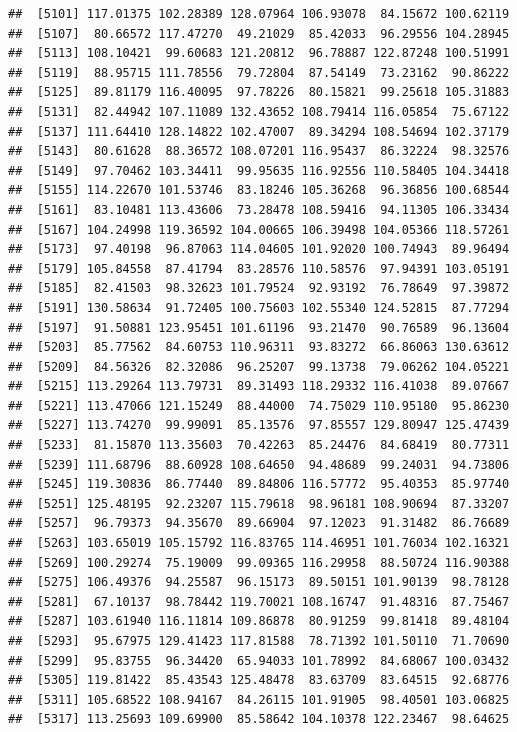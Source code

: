 \documentclass[
]{article}
\begin{document}
\begin{verbatim}
##  [5101] 117.01375 102.28389 128.07964 106.93078  84.15672 100.62119
##  [5107]  80.66572 117.47270  49.21029  85.42033  96.29556 104.28945
##  [5113] 108.10421  99.60683 121.20812  96.78887 122.87248 100.51991
##  [5119]  88.95715 111.78556  79.72804  87.54149  73.23162  90.86222
##  [5125]  89.81179 116.40095  97.78226  80.15821  99.25618 105.31883
##  [5131]  82.44942 107.11089 132.43652 108.79414 116.05854  75.67122
##  [5137] 111.64410 128.14822 102.47007  89.34294 108.54694 102.37179
##  [5143]  80.61628  88.36572 108.07201 116.95437  86.32224  98.32576
##  [5149]  97.70462 103.34411  99.95635 116.92556 110.58405 104.34418
##  [5155] 114.22670 101.53746  83.18246 105.36268  96.36856 100.68544
##  [5161]  83.10481 113.43606  73.28478 108.59416  94.11305 106.33434
##  [5167] 104.24998 119.36592 104.00665 106.39498 104.05366 118.57261
##  [5173]  97.40198  96.87063 114.04605 101.92020 100.74943  89.96494
##  [5179] 105.84558  87.41794  83.28576 110.58576  97.94391 103.05191
##  [5185]  82.41503  98.32623 101.79524  92.93192  76.78649  97.39872
##  [5191] 130.58634  91.72405 100.75603 102.55340 124.52815  87.77294
##  [5197]  91.50881 123.95451 101.61196  93.21470  90.76589  96.13604
##  [5203]  85.77562  84.60753 110.96311  93.83272  66.86063 130.63612
##  [5209]  84.56326  82.32086  96.25207  99.13738  79.06262 104.05221
##  [5215] 113.29264 113.79731  89.31493 118.29332 116.41038  89.07667
##  [5221] 113.47066 121.15249  88.44000  74.75029 110.95180  95.86230
##  [5227] 113.74270  99.99091  85.13576  97.85557 129.80947 125.47439
##  [5233]  81.15870 113.35603  70.42263  85.24476  84.68419  80.77311
##  [5239] 111.68796  88.60928 108.64650  94.48689  99.24031  94.73806
##  [5245] 119.30836  86.77440  89.84806 116.57772  95.40353  85.97740
##  [5251] 125.48195  92.23207 115.79618  98.96181 108.90694  87.33207
##  [5257]  96.79373  94.35670  89.66904  97.12023  91.31482  86.76689
##  [5263] 103.65019 105.15792 116.83765 114.46951 101.76034 102.16321
##  [5269] 100.29274  75.19009  99.09365 116.29958  88.50724 116.90388
##  [5275] 106.49376  94.25587  96.15173  89.50151 101.90139  98.78128
##  [5281]  67.10137  98.78442 119.70021 108.16747  91.48316  87.75467
##  [5287] 103.61940 116.11814 109.86878  80.91259  99.81418  89.48104
##  [5293]  95.67975 129.41423 117.81588  78.71392 101.50110  71.70690
##  [5299]  95.83755  96.34420  65.94033 101.78992  84.68067 100.03432
##  [5305] 119.81422  85.43543 125.48478  83.63709  83.64515  92.68776
##  [5311] 105.68522 108.94167  84.26115 101.91905  98.40501 103.06825
##  [5317] 113.25693 109.69900  85.58642 104.10378 122.23467  98.64625

\end{verbatim}
\end{document}
